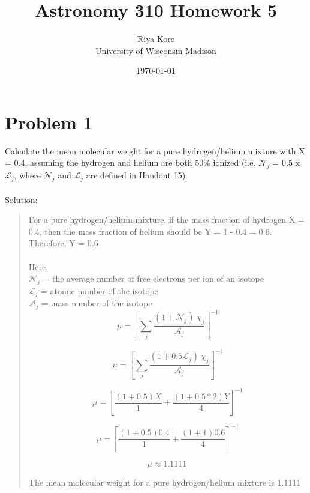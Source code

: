 \documentclass[10pt]{article}
\def \MYID{Riya Kore}
\begin{document}

\pagestyle{headings}

\title{Astronomy 310 Homework 5}
\author{\MYID\\
University of Wisconsin-Madison}
\date{\today}
\maketitle

\section*{Problem 1}
Calculate the mean molecular weight for a pure hydrogen/helium mixture with X = 0.4, assuming the hydrogen and helium are both 50\% ionized (i.e. $\mathscr{N}_j$ = 0.5 x $\mathscr{L}_j$, where $\mathscr{N}_j$ and $\mathscr{L}_j$ are defined in Handout 15). \\ \\
Solution:

\setlength{\parindent}{1cm}
\begin{quote}
For a pure hydrogen/helium mixture, if the mass fraction of hydrogen X = 0.4, then the mass fraction of helium should be Y = 1 - 0.4 = 0.6.\\
Therefore, Y = 0.6\\ \\
Here, \\$\mathscr{N}_j$ = the average number of free electrons per ion of an isotope\\
$\mathscr{L}_j$ = atomic number of the isotope\\
$\mathcal{A}_j$ = mass number of the isotope\\

\[ \mu = \left[ \sum_j {\frac{(1 + \mathscr{N}_j) \ \chi_{j}}{\mathcal{A}_j}} \right]^{-1} \]

\[ \mu = \left[ \sum_j {\frac{(1 + 0.5\mathscr{L}_j) \ \chi_{j}}{\mathcal{A}_j}} \right]^{-1} \]

\[ \mu = \left[ {\frac{(1 + 0.5)X}{1}} + {\frac{(1 + 0.5*2)Y}{4}}\right]^{-1} \]

\[ \mu = \left[ {\frac{(1 + 0.5)0.4}{1}} + {\frac{(1 + 1)0.6}{4}}\right]^{-1} \]

\[ \mu \approx 1.1111 \ \]

The mean molecular weight for a pure hydrogen/helium mixture is 1.1111 
\end{quote}
\end{document}
